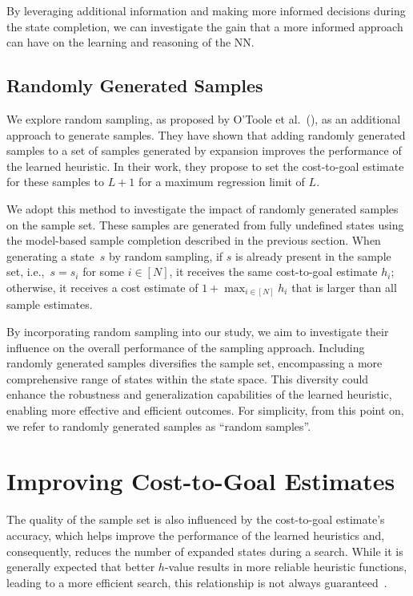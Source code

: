 By leveraging additional information and making more informed decisions during the state completion, we can investigate the gain that a more informed approach can have on the learning and reasoning of the NN.

\subsection{Randomly Generated Samples}
\label{sec:random-samples-theory}

We explore random sampling, as proposed by O'Toole et al.~(\citeyear{OToole/2022}), as an additional approach to generate samples. They have shown that adding randomly generated samples to a set of samples generated by expansion improves the performance of the learned heuristic. In their work, they propose to set the cost-to-goal estimate for these samples to $L+1$ for a maximum regression limit of $L$.

We adopt this method to investigate the impact of randomly generated samples on the sample set. These samples are generated from fully undefined states using the model-based sample completion described in the previous section. When generating a state~$s$ by random sampling, if $s$ is already present in the sample set, i.e.,~$s = s_i$ for some $i\in[N]$, it receives the same cost-to-goal estimate $h_i$; otherwise, it receives a cost estimate of $1+\max_{i\in[N]} h_i$ that is larger than all sample estimates.

By incorporating random sampling into our study, we aim to investigate their influence on the overall performance of the sampling approach. Including randomly generated samples diversifies the sample set, encompassing a more comprehensive range of states within the state space. This diversity could enhance the robustness and generalization capabilities of the learned heuristic, enabling more effective and efficient outcomes. For simplicity, from this point on, we refer to randomly generated samples as ``random samples''.

\section{Improving Cost-to-Goal Estimates}
\label{sec:hvalue}

The quality of the sample set is also influenced by the cost-to-goal estimate's accuracy, which helps improve the performance of the learned heuristics and, consequently, reduces the number of expanded states during a search. While it is generally expected that better $h$-value results in more reliable heuristic functions, leading to a more efficient search, this relationship is not always guaranteed~\cite{Holte/2010}.

